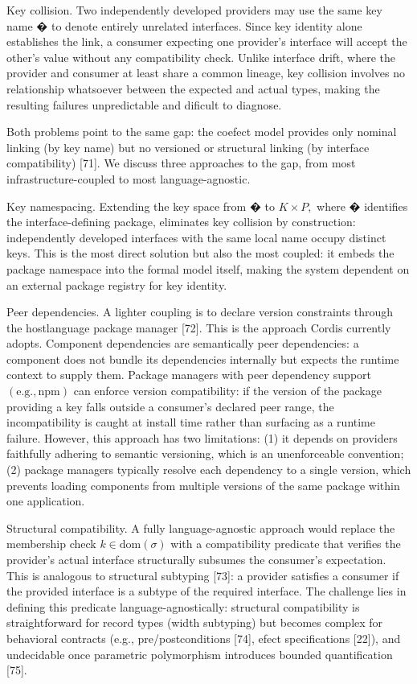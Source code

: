 \documentclass[
  10
]{article}
\begin{document}
Key collision. Two independently developed providers may use the same
key name � to denote entirely unrelated interfaces. Since key identity
alone establishes the link, a consumer expecting one provider's
interface will accept the other's value without any compatibility check.
Unlike interface drift, where the provider and consumer at least share a
common lineage, key collision involves no relationship whatsoever
between the expected and actual types, making the resulting failures
unpredictable and dificult to diagnose.

Both problems point to the same gap: the coefect model provides only
nominal linking (by key name) but no versioned or structural linking (by
interface compatibility) {[}71{]}. We discuss three approaches to the
gap, from most infrastructure-coupled to most language-agnostic.

Key namespacing. Extending the key space from � to \(K \times P ,\)
where � identifies the interface-defining package, eliminates key
collision by construction: independently developed interfaces with the
same local name occupy distinct keys. This is the most direct solution
but also the most coupled: it embeds the package namespace into the
formal model itself, making the system dependent on an external package
registry for key identity.

Peer dependencies. A lighter coupling is to declare version constraints
through the hostlanguage package manager {[}72{]}. This is the approach
Cordis currently adopts. Component dependencies are semantically peer
dependencies: a component does not bundle its dependencies internally
but expects the runtime context to supply them. Package managers with
peer dependency support \(( \mathrm { e . g . , n p m } )\) can enforce
version compatibility: if the version of the package providing a key
falls outside a consumer's declared peer range, the incompatibility is
caught at install time rather than surfacing as a runtime failure.
However, this approach has two limitations: (1) it depends on providers
faithfully adhering to semantic versioning, which is an unenforceable
convention; (2) package managers typically resolve each dependency to a
single version, which prevents loading components from multiple versions
of the same package within one application.

Structural compatibility. A fully language-agnostic approach would
replace the membership check \(k \in \mathrm { d o m } ( \sigma )\) with
a compatibility predicate that verifies the provider's actual interface
structurally subsumes the consumer's expectation. This is analogous to
structural subtyping {[}73{]}: a provider satisfies a consumer if the
provided interface is a subtype of the required interface. The challenge
lies in defining this predicate language-agnostically: structural
compatibility is straightforward for record types (width subtyping) but
becomes complex for behavioral contracts (e.g., pre/postconditions
{[}74{]}, efect specifications {[}22{]}), and undecidable once
parametric polymorphism introduces bounded quantification {[}75{]}.
\end{document}
